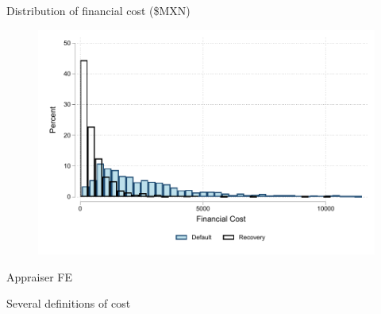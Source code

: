 \documentclass[8pt]{beamer}
\begin{document}
\begin{frame}{Distribution of financial cost (\$MXN)}
    \begin{figure}
     \centering
        \includegraphics[width=.8\textwidth]{Figuras/hist_fc.pdf}
    \end{figure}
    
    \hyperlink{fc_outcome}{}

\end{frame}


\begin{frame}{Appraiser FE}
\label{clerk_fe}
\begin{table}[H]
\begin{center}
\resizebox{0.95\textwidth}{!}{
\small{}
}
\end{center}
 \scriptsize 
 
\end{table}
    \hyperlink{main_results}{}

\end{frame}



\begin{frame}{Several definitions of cost}
\label{several_def_cost}
\begin{table}[H]
\caption{Effects on several definitions of cost}
\label{table_robustness_fc}
\begin{center}
\resizebox{0.95\textwidth}{!}{
\small{}
}
\end{center}
 \scriptsize 
 
\end{table}
    \hyperlink{main_results}{}

\end{frame}
\end{document}
